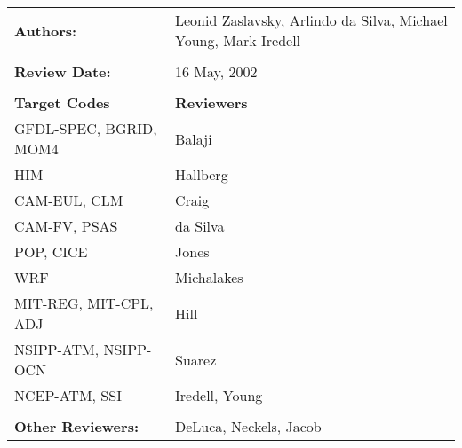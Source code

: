 \begin{tabular}{l l}

{\bf Authors:} & Leonid Zaslavsky, Arlindo da Silva, Michael Young, Mark Iredell \\ \\

{\bf Review Date:}            & 16 May, 2002 \\ \\

{\bf Target Codes}            & {\bf Reviewers} \\
GFDL-SPEC, BGRID, MOM4        & Balaji \\ 
HIM                           & Hallberg \\
CAM-EUL, CLM                  & Craig \\
CAM-FV, PSAS                  & da Silva \\
POP, CICE                     & Jones \\
WRF                           & Michalakes \\
MIT-REG, MIT-CPL, ADJ         & Hill \\
NSIPP-ATM, NSIPP-OCN          & Suarez \\
NCEP-ATM, SSI                 & Iredell, Young \\ \\

{\bf Other Reviewers:}        & DeLuca, Neckels, Jacob

\end{tabular}


%



%

%

